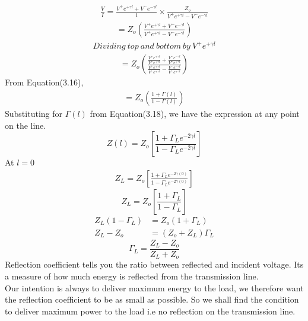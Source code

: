 \begin{align*}
\frac{V}{I} = \frac{V^+e^{+\gamma l}+V^-e^{-\gamma l}}{1}\times \frac{Z_o}{V^+e^{+\gamma l}-V^-e^{-\gamma l}}
\end{align*}
\begin{align*}
= Z_o\left( \frac{V^+e^{+\gamma l}+V^-e^{-\gamma l}}{V^+e^{+\gamma l}-V^-e^{-\gamma l}}\right) 
\end{align*}
\begin{align*}
Dividing\ top\ and\ bottom\ by\ V^+e^{+\gamma l}
\end{align*}
\begin{align*}
= Z_o\left( \frac{\frac{V^+e^{+\gamma l}}{V^+e^{+\gamma l}}+\frac{V^-e^{-\gamma l}}{V^+e^{+\gamma l}}}{\frac{V^+e^{+\gamma l}}{V^+e^{+\gamma l}}-\frac{V^-e^{-\gamma l}}{V^+e^{+\gamma l}}}\right) 
\end{align*}
From Equation(3.16),
\begin{align*}
=Z_o\left( \frac{1+\Gamma (l)}{1 -\Gamma (l)}\right) 
\end{align*}
Substituting for $\Gamma (l)$ from Equation(3.18), we have the expression at any point on the line.
\begin{equation}
Z(l) = Z_o\left[ \frac{1 + \Gamma_L e^{-2\gamma l}}{1 - \Gamma_L e^{-2\gamma l}}\right] 
\end{equation}
At $l = 0$ 
\begin{align*}
Z_L = Z_o\left[ \frac{1 + \Gamma_L e^{-2\gamma (0)}}{1 - \Gamma_L e^{-2\gamma (0)}}\right] 
\end{align*}
\begin{equation}
Z_L = Z_o\left[\frac{1 + \Gamma_L}{1 - \Gamma_L}\right] 
\end{equation}
\begin{align*}
Z_L(1 - \Gamma_L) &= Z_o(1 + \Gamma_L)\\
Z_L - Z_o &= (Z_o + Z_L)\Gamma_L
\end{align*}
\begin{equation}
\Gamma_L = \frac{Z_L - Z_o}{Z_L + Z_o}
\end{equation}
Reflection coefficient tells you the ratio between reflected and incident voltage. Its a measure of how much energy is reflected from the transmission line. \\

Our intention is always to deliver maximum energy to the load, we therefore want the reflection coefficient to be as small as possible. So we shall find the condition to deliver maximum power to the load i.e no reflection on the transmission line.